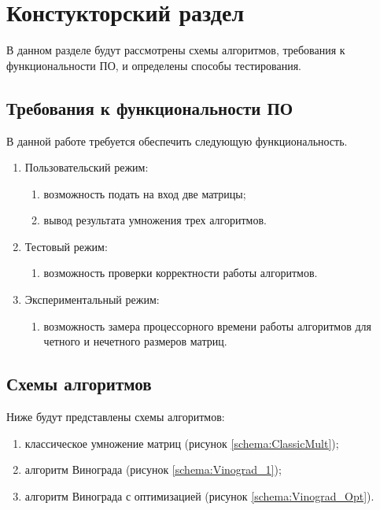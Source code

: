 \chapter{ Констукторский раздел}
\label{cha:design}
    В данном разделе будут рассмотрены схемы алгоритмов, требования к функциональности ПО, и определены способы тестирования.
    
    \section{Требования к функциональности ПО}
        В данной работе требуется обеспечить следующую функциональность.
        \begin{enumerate}
            \item Пользовательский режим:
            \begin{enumerate}
                \item возможность подать на вход две матрицы;
                \item вывод результата умножения трех алгоритмов.
            \end{enumerate}
	       \item Тестовый режим: 
            \begin{enumerate}
            	\item возможность проверки корректности работы алгоритмов.
            \end{enumerate}
            \item Экспериментальный режим: 
            \begin{enumerate}
                \item возможность замера процессорного времени работы алгоритмов для четного и нечетного размеров матриц.
            \end{enumerate}
        \end{enumerate}
	
	\section{Схемы алгоритмов}
        Ниже будут представлены схемы алгоритмов: \begin{enumerate}
            \item классическое умножение матриц (рисунок \ref{schema:ClassicMult});
            \item алгоритм Винограда (рисунок \ref{schema:Vinograd_1});
            \item алгоритм Винограда с оптимизацией (рисунок \ref{schema:Vinograd_Opt}).
        \end{enumerate}
      
